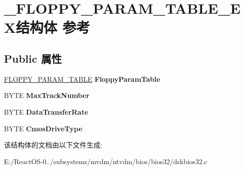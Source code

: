 \hypertarget{struct___f_l_o_p_p_y___p_a_r_a_m___t_a_b_l_e___e_x}{}\section{\+\_\+\+F\+L\+O\+P\+P\+Y\+\_\+\+P\+A\+R\+A\+M\+\_\+\+T\+A\+B\+L\+E\+\_\+\+E\+X结构体 参考}
\label{struct___f_l_o_p_p_y___p_a_r_a_m___t_a_b_l_e___e_x}
\subsection*{Public 属性}
\begin{DoxyCompactItemize}
\item 
\mbox{\label{struct___f_l_o_p_p_y___p_a_r_a_m___t_a_b_l_e___e_x_a4ab732ba4df828240b31e9ecb86cbc08}} 
\hyperlink{struct___f_l_o_p_p_y___p_a_r_a_m___t_a_b_l_e}{F\+L\+O\+P\+P\+Y\+\_\+\+P\+A\+R\+A\+M\+\_\+\+T\+A\+B\+LE} {\bfseries Floppy\+Param\+Table}
\item 
\mbox{\label{struct___f_l_o_p_p_y___p_a_r_a_m___t_a_b_l_e___e_x_a83170ab94bf315c2e39d3776f4fec562}} 
B\+Y\+TE {\bfseries Max\+Track\+Number}
\item 
\mbox{\label{struct___f_l_o_p_p_y___p_a_r_a_m___t_a_b_l_e___e_x_a61ce555dc702abc169bc19aa2da9b479}} 
B\+Y\+TE {\bfseries Data\+Transfer\+Rate}
\item 
\mbox{\label{struct___f_l_o_p_p_y___p_a_r_a_m___t_a_b_l_e___e_x_acfeac2d11c79347165092afc74b44c53}} 
B\+Y\+TE {\bfseries Cmos\+Drive\+Type}
\end{DoxyCompactItemize}


该结构体的文档由以下文件生成\+:\begin{DoxyCompactItemize}
\item 
E\+:/\+React\+O\+S-\/0../subsystems/mvdm/ntvdm/bios/bios32/dskbios32.\+c\end{DoxyCompactItemize}
